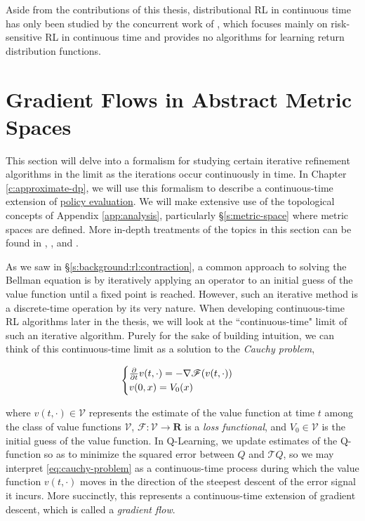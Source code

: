 Aside from the contributions of this thesis, distributional RL in
continuous time has only been studied by the concurrent work of
\citet{halperin2021distributional}, which focuses mainly on
risk-sensitive RL in continuous time and provides no algorithms for
learning return distribution functions.

\section{Gradient Flows in Abstract Metric Spaces}\label{s:gradient-flows}
This section will delve into a formalism for studying certain iterative
refinement algorithms in the limit as the iterations occur continuously in time.
In Chapter \ref{c:approximate-dp}, we will use this formalism to describe a
continuous-time extension of \hyperref[eq:policy-evaluation]{policy evaluation}.
We will make extensive use of the topological concepts of Appendix
\ref{app:analysis}, particularly \S\ref{s:metric-space} where metric spaces are
defined. More in-depth treatments of the topics in this section can be found in
\citet{ambrosio2008gradient}, \citet{santambrogio2015optimal}, and
\citet{villani2008optimal}.

As we saw in \S\ref{s:background:rl:contraction}, a common approach to solving
the Bellman equation is by iteratively applying an operator to an initial guess
of the value function until a fixed point is reached. However, such an iterative
method is a discrete-time operation by its very nature. When developing
continuous-time RL algorithms later in the thesis, we will look at the
``continuous-time" limit of such an iterative algorithm. Purely for the sake of
building intuition, we can think of this continuous-time limit as a solution to
the \emph{Cauchy problem}\citep{ambrosio2008gradient},

\begin{equation}\label{eq:cauchy-problem}
  \begin{cases}
    \frac{\partial }{\partial t}v(t, \cdot) = -\nabla\mathscr{F}(v(t, \cdot))\\
    v(0, x) = V_0(x)
  \end{cases}
\end{equation}

where $v(t, \cdot)\in\mathcal{V}$ represents the estimate of the value
function at time $t$ among the class of value functions $\mathcal{V}$,
$\mathscr{F}:\mathcal{V}\to\mathbf{R}$ is a \emph{loss functional}, and
$V_0\in\mathcal{V}$ is the initial guess of the value function. In Q-Learning,
we update estimates of the Q-function so as to minimize the squared error
between $Q$ and $\mathscr{T}Q$, so we may interpret \eqref{eq:cauchy-problem} as
a continuous-time process during which the value function $v(t, \cdot)$ moves
in the direction of the steepest descent of the error signal it incurs. More
succinctly, this represents a continuous-time extension of gradient descent,
which is called a \emph{gradient flow}.

